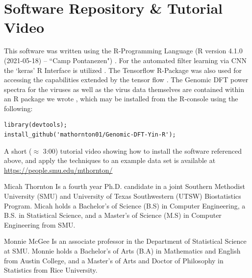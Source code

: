 \documentclass[12pt,conference]{IEEEtran}
\begin{document}
\section{Software Repository \& Tutorial Video}
{\small
This software was written using the R-Programming Language (R version 4.1.0 (2021-05-18) -- ``Camp Pontanezen") \cite{r21}.   For the automated filter learning via CNN the `keras' R Interface is utilized \cite{kerR21}.  The Tensorflow R-Package was also used for 
accessing the capabilities extended by the tensor flow \cite{tfR21}.  The Genomic DFT power spectra for the viruses as well as the virus data themselves are contained within an R package we wrote \cite{dftR}, which may be installed from the R-console using the following: 

\begin{lstlisting} 
library(devtools);
install_github('mathornton01/Genomic-DFT-Yin-R'); 
\end{lstlisting} 
\vspace{-2 em}

A short ($\approx$ 3:00) tutorial video showing how to install the software referenced above, and apply 
the techniques to an example data set is available at \url{https://people.smu.edu/mthornton/} 
}
\begin{IEEEbiographynophoto}{Micah Thornton}
Is a fourth year Ph.D. candidate in a joint Southern Methodist University (SMU) and University of Texas Southwestern (UTSW) Biostatistics Program.  Micah holds a Bachelor's of Science (B.S) in Computer Engineering, a B.S. in Statistical Science, and a Master's of Science (M.S) in Computer Engineering from SMU. 
\end{IEEEbiographynophoto}

\begin{IEEEbiographynophoto}{Monnie McGee} 
Is an associate professor in the Department of Statistical Science at SMU. Monnie holds a Bachelor's of Arts (B.A) in Mathematics and English from Austin College, and a Master's of Arts and Doctor of Philosophy in Statistics from Rice University.  

\end{IEEEbiographynophoto}
\end{document}
